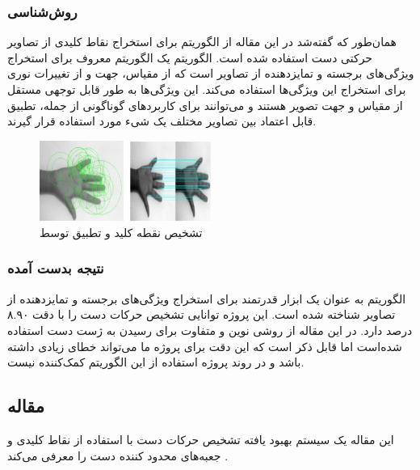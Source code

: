 \subsubsection{روش‌شناسی}
همان‌طور که گفته‌شد در این مقاله از الگوریتم  برای استخراج نقاط کلیدی از تصاویر حرکتی دست استفاده شده است. الگوریتم  یک الگوریتم معروف برای استخراج ویژگی‌های برجسته 
و تمایزدهنده از تصاویر است که از مقیاس، جهت و از تغییرات نوری برای استخراج این ویژگی‌ها استفاده می‌کند. این ویژگی‌ها به طور قابل توجهی مستقل از 
مقیاس و جهت تصویر هستند و می‌توانند برای کاربرد‌های گوناگونی از جمله، تطبیق قابل اعتماد بین تصاویر مختلف یک شیء مورد استفاده قرار گیرند.

\begin{figure}[h]
    \centering
    \includegraphics[width=0.5\textwidth]{SIFT.png}
    \caption{تشخیص نقطه کلید و تطبیق توسط }
\end{figure}

\subsubsection{نتیجه بدست آمده}
الگوریتم  به عنوان یک ابزار قدرتمند برای استخراج ویژگی‌های برجسته و تمایزدهنده از تصاویر شناخته شده است. این پروژه توانایی تشخیص حرکات دست را با دقت ۸.۹۰ درصد دارد. در این مقاله از روشی نوین و متفاوت برای رسیدن به ژست دست استفاده شده‌است اما قابل ذکر است که این دقت برای پروژه ما می‌تواند خطای زیادی داشته باشد و در روند پروژه استفاده از این الگوریتم کمک‌کننده نیست.




\subsection{مقاله }
این مقاله یک سیستم بهبود یافته تشخیص حرکات دست با استفاده از نقاط کلیدی و جعبه‌های محدود کننده دست را معرفی می‌کند \cite{dang2022improved}.



